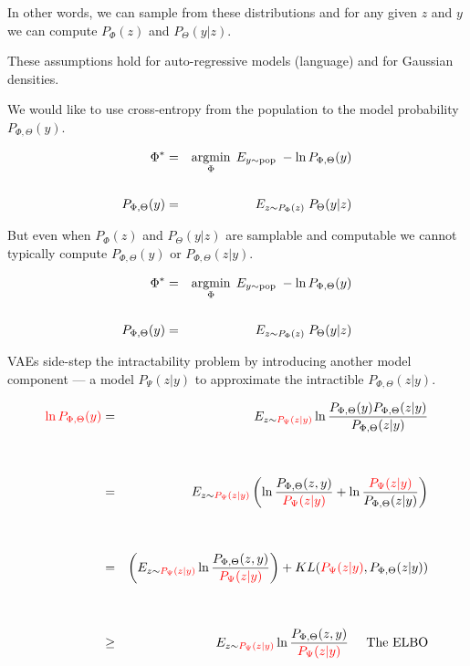 {\vfill
In other words, we can sample from these distributions and for any given $z$ and $y$ we can compute $P_\Phi(z)$ and $P_\Theta(y|z)$.

\vfill
These assumptions hold for auto-regressive models (language) and for Gaussian densities.


\vfill
We would like to use cross-entropy from the population to the model probability $P_{\Phi,\Theta}(y)$.

\begin{eqnarray*}
\Phi^* & = & \operatorname*{argmin}_\Phi \;E_{y \sim \mathrm{pop}}\;-\ln P_{\Phi,\Theta}(y) \\
\\
P_{\Phi,\Theta}(y) & = & E_{z \sim P_\Phi(z)}\;P_\Theta(y|z)
\end{eqnarray*}

\vfill
But even when $P_\Phi(z)$ and $P_\Theta(y|z)$ are samplable and computable we cannot typically compute $P_{\Phi,\Theta}(y)$ or $P_{\Phi,\Theta}(z|y)$.


\begin{eqnarray*}
\Phi^* & = & \operatorname*{argmin}_\Phi \;E_{y \sim \mathrm{pop}}\;-\ln P_{\Phi,\Theta}(y) \\
\\
P_{\Phi,\Theta}(y) & = & E_{z \sim P_\Phi(z)}\;P_\Theta(y|z)
\end{eqnarray*}

\vfill
VAEs side-step the intractability problem by introducing another model component --- a model $P_\Psi(z|y)$ to approximate the intractible $P_{\Phi,\Theta}(z|y)$.


{\huge
\begin{eqnarray*}
 {\color{red} \ln P_{\Phi,\Theta}(y)} & = & E_{z \sim {\color{red} P_\Psi(z|y)}} \ln \frac{P_{\Phi,\Theta}(y)P_{\Phi,\Theta}(z|y)}{P_{\Phi,\Theta}(z|y)} \\
        \\
        \\
 & = & E_{z \sim {\color{red} P_\Psi(z|y)}} \left(\ln \frac{P_{\Phi,\Theta}(z,y)}{{\color{red} P_\Psi(z|y)}} + \ln \frac{{\color{red} P_\Psi(z|y)}}{P_{\Phi,\Theta}(z|y)}\right) \\
 \\
 \\
  & = & \left(E_{z \sim {\color{red} P_\Psi(z|y)}} \ln \frac{P_{\Phi,\Theta}(z,y)}{{\color{red} P_\Psi(z|y)}}\right) + KL({\color{red} P_\Psi(z|y)},P_{\Phi,\Theta}(z|y)) \\
  \\
  \\
  &  \geq & E_{z \sim {\color{red} P_\Psi(z|y)}} \ln \frac{P_{\Phi,\Theta}(z,y)}{{\color{red} P_\Psi(z|y)}} \;\;\;\;\;\mbox{The ELBO}
\end{eqnarray*}
}

}

